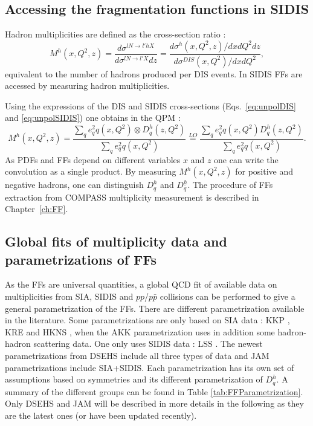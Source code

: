 \subsection{Accessing the fragmentation functions in SIDIS}

Hadron multiplicities are defined as the cross-section ratio :
%
\begin{equation}
  M^h(x,Q^2,z) = \frac{d\sigma^{lN \rightarrow l'hX}}{d\sigma^{lN \rightarrow l'X}dz} = \frac{d\sigma^h(x,Q^2,z)/dxdQ^2dz}{d\sigma^{DIS}(x,Q^2)/dxdQ^2},
\end{equation}
%
equivalent to the number of hadrons produced per DIS events. In SIDIS FFs are accessed by measuring hadron multiplicities.

Using the expressions of the DIS and SIDIS cross-sections (Eqs.~\ref{eq:unpolDIS} and \ref{eq:unpolSIDIS}) one obtains in the QPM :
%
\begin{equation}\label{eq:MFFPDF}
  M^h(x,Q^2,z) = \frac{\sum_q e^2_q q(x,Q^2) \otimes D^h_q(z,Q^2)}{\sum_q e^2_q q(x,Q^2)} \stackrel{LO}{=} \frac{\sum_q e^2_q q(x,Q^2) D^h_q(z,Q^2)}{\sum_q e^2_q q(x,Q^2)}.
\end{equation}
%
As PDFs and FFs depend on different variables $x$ and $z$ one can write the convolution as a single product. By measuring $M^h(x,Q^2,z)$ for positive and negative hadrons, one can distinguish $D^h_q$ and $D^h_{\bar{q}}$. The procedure of FFs extraction from COMPASS multiplicity measurement is described in Chapter~\ref{ch:FF}.

\subsection{Global fits of multiplicity data and parametrizations of FFs}

As the FFs are universal quantities, a global QCD fit of available data on multiplicities from SIA, SIDIS and $pp$/$p\bar{p}$ collisions can be performed to give a general parametrization of the FFs. There are different parametrization available in the literature. Some parametrizations are only based on SIA data : KKP \cite{Universality}, KRE \cite{KRE} and HKNS \cite{HKNS}, when the AKK \cite{AKK} parametrization uses in addition some hadron-hadron scattering data. One only uses SIDIS data : LSS \cite{LSS}. The newest parametrizations from DSEHS \cite{DSEHS1,DSEHS2} include all three types of data and JAM \cite{JAM} parametrizations include SIA+SIDIS. Each parametrization has its own set of assumptions based on symmetries and its different parametrization of $D^h_q$. A summary of the different groups can be found in Table \ref{tab:FFParametrization}. Only DSEHS and JAM will be described in more details in the following as they are the latest ones (or have been updated recently).

